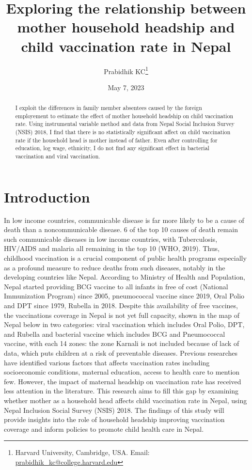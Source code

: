 \documentclass[12pt]{article}
\title{Exploring the relationship between mother household headship and child vaccination rate in Nepal
}
\author{Prabidhik KC\thanks{Harvard University, Cambridge, USA. Email: \href{mailto:prabidhik_kc@college.harvard.edu}{prabidhik_kc@college.harvard.edu}}}
\date{May 7, 2023}
\begin{document}
\maketitle

\begin{abstract}
I exploit the differences in family member absentees caused by the foreign employement to estimate the effect of mother household headship on child vaccination rate. Using instrumental variable method and data from Nepal Social Inclusion Survey (NSIS) 2018, I find that there is no statistically significant affect on child vaccination rate if the household head is mother instead of father. Even after controlling for education, log wage, ethnicity, I do not find any significant effect in bacterial vaccination and viral vaccination.
\end{abstract}

\section{Introduction}
In low income countries, communicable disease is far more likely to be a cause of death than a noncommunicable disease. 6 of the top 10 causes of death remain such communicable diseases in low income countries, with Tuberculosis, HIV/AIDS and malaria all remaining in the top 10 (WHO, 2019). Thus, childhood vaccination is a crucial component of public health programs especially as a profound measure to reduce deaths from such diseases, notably in the developing countries like Nepal. According to Ministry of Health and Population, Nepal started providing BCG vaccine to all infants in free of cost (National Immunization Program) since 2005, pneumococcal vaccine since  2019, Oral Polio and DPT since 1979, Rubella in 2018. Despite this availability of free vaccines, the vaccinations coverage in Nepal is not yet full capacity, shown in the map of Nepal below in two categories: viral vaccination which includes Oral Polio, DPT, and Rubella and bacterial vaccine which includes BCG and Pneumococcal vaccine, with each 14 zones: the zone Karnali is not included because of lack of data, which puts children at a risk of preventable diseases. Previous researches have identified various factors that affects vaccination rates including socioeconomic conditions, maternal education, access to health care to mention few. However, the impact of maternal headship on vaccination rate has received less attention in the literature. This research aims to fill this gap by examining whether mother as a household head affects child vaccination rate in Nepal, using Nepal Inclusion Social Survey (NSIS) 2018. The findings of this study will provide insights into the role of household headship improving vaccination coverage and inform policies to promote child health care in Nepal.
\end{document}

